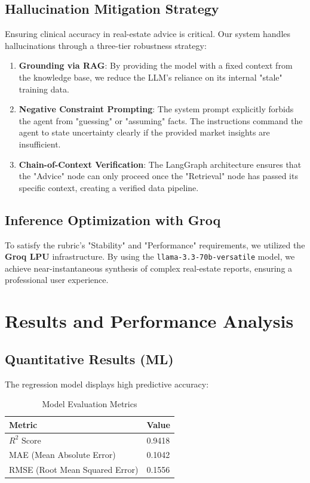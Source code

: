 \documentclass[12pt,a4paper]{article}
\begin{document}
\subsection{Hallucination Mitigation Strategy}
Ensuring clinical accuracy in real-estate advice is critical. Our system handles hallucinations through a three-tier robustness strategy:
\begin{enumerate}
    \item \textbf{Grounding via RAG}: By providing the model with a fixed context from the knowledge base, we reduce the LLM's reliance on its internal "stale" training data.
    \item \textbf{Negative Constraint Prompting}: The system prompt explicitly forbids the agent from "guessing" or "assuming" facts. The instructions command the agent to state uncertainty clearly if the provided market insights are insufficient.
    \item \textbf{Chain-of-Context Verification}: The LangGraph architecture ensures that the "Advice" node can only proceed once the "Retrieval" node has passed its specific context, creating a verified data pipeline.
\end{enumerate}

\subsection{Inference Optimization with Groq}
To satisfy the rubric's "Stability" and "Performance" requirements, we utilized the \textbf{Groq LPU} infrastructure. By using the \texttt{llama-3.3-70b-versatile} model, we achieve near-instantaneous synthesis of complex real-estate reports, ensuring a professional user experience.

\section{Results and Performance Analysis}

\subsection{Quantitative Results (ML)}
The regression model displays high predictive accuracy:
\begin{table}[h]
    \centering
    \begin{tabular}{ll}
        \toprule
        \textbf{Metric} & \textbf{Value} \\
        \midrule
        $R^2$ Score & 0.9418 \\
        MAE (Mean Absolute Error) & 0.1042 \\
        RMSE (Root Mean Squared Error) & 0.1556 \\
        \bottomrule
    \end{tabular}
    \caption{Model Evaluation Metrics}
\end{table}
\end{document}
